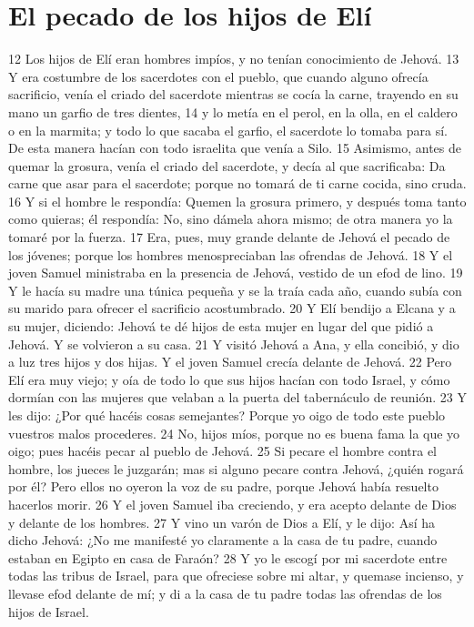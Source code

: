 \section*{El pecado de los hijos de Elí}

12 Los hijos de Elí eran hombres impíos, y no tenían conocimiento de Jehová.
13 Y era costumbre de los sacerdotes con el pueblo, que cuando alguno ofrecía sacrificio, venía el criado del sacerdote mientras se cocía la carne, trayendo en su mano un garfio de tres dientes,
14 y lo metía en el perol, en la olla, en el caldero o en la marmita; y todo lo que sacaba el garfio, el sacerdote lo tomaba para sí. De esta manera hacían con todo israelita que venía a Silo.
15 Asimismo, antes de quemar la grosura, venía el criado del sacerdote, y decía al que sacrificaba: Da carne que asar para el sacerdote; porque no tomará de ti carne cocida, sino cruda.
16 Y si el hombre le respondía: Quemen la grosura primero, y después toma tanto como quieras; él respondía: No, sino dámela ahora mismo; de otra manera yo la tomaré por la fuerza.
17 Era, pues, muy grande delante de Jehová el pecado de los jóvenes; porque los hombres menospreciaban las ofrendas de Jehová.
18 Y el joven Samuel ministraba en la presencia de Jehová, vestido de un efod de lino.
19 Y le hacía su madre una túnica pequeña y se la traía cada año, cuando subía con su marido para ofrecer el sacrificio acostumbrado.
20 Y Elí bendijo a Elcana y a su mujer, diciendo: Jehová te dé hijos de esta mujer en lugar del que pidió a Jehová. Y se volvieron a su casa.
21 Y visitó Jehová a Ana, y ella concibió, y dio a luz tres hijos y dos hijas. Y el joven Samuel crecía delante de Jehová.
22 Pero Elí era muy viejo; y oía de todo lo que sus hijos hacían con todo Israel, y cómo dormían con las mujeres que velaban a la puerta del tabernáculo de reunión.
23 Y les dijo: ¿Por qué hacéis cosas semejantes? Porque yo oigo de todo este pueblo vuestros malos procederes.
24 No, hijos míos, porque no es buena fama la que yo oigo; pues hacéis pecar al pueblo de Jehová.
25 Si pecare el hombre contra el hombre, los jueces le juzgarán; mas si alguno pecare contra Jehová, ¿quién rogará por él? Pero ellos no oyeron la voz de su padre, porque Jehová había resuelto hacerlos morir.
26 Y el joven Samuel iba creciendo, y era acepto delante de Dios y delante de los hombres.
27 Y vino un varón de Dios a Elí, y le dijo: Así ha dicho Jehová: ¿No me manifesté yo claramente a la casa de tu padre, cuando estaban en Egipto en casa de Faraón?
28 Y yo le escogí por mi sacerdote entre todas las tribus de Israel, para que ofreciese sobre mi altar, y quemase incienso, y llevase efod delante de mí; y di a la casa de tu padre todas las ofrendas de los hijos de Israel. 

